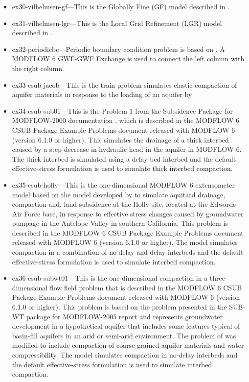 \begin{itemize}
\item ex30-vilhelmsen-gf---This is the Globally Fine (GF) model described in \cite{vilhelmsen2012evaluation}.

\item ex31-vilhelmsen-lgr---This is the Local Grid Refinement (LGR) model described in \cite{vilhelmsen2012evaluation}.

\item ex32-periodicbc---Periodic boundary condition problem is based on \cite{laattoe2014spatial}. A MODFLOW 6 GWF-GWF Exchange is used to connect the left column with the right column. 

\item ex33-csub-jacob---This is the \cite{jacob1939fluctuations} train problem simulates elastic compaction of aquifer materials in response to the loading of an aquifer by

\item ex34-csub-sub01---This is the Problem 1 from the Subsidence Package for MODFLOW-2000 documentation \citep{hoffmann2003modflow}, which is described in the MODFLOW 6 CSUB Package Example Problems document released with MODFLOW 6 (version 6.1.0 or higher).  This simulates the drainage of a thick interbed caused by a step decrease in hydraulic head in the aquifer in MODFLOW 6. The thick interbed is simulated using a delay-bed interbed and the default effective-stress formulation is used to simulate thick interbed compaction.

\item ex35-csub-holly---This is the one-dimensional MODFLOW 6 extensometer model based on the model developed by \cite{sneed2008} to simulate aquitard drainage, compaction and, land subsidence at the Holly site, located at the Edwards Air Force base, in response to effective stress changes caused by groundwater pumpage in the Antelope Valley in southern California. This problem is described in the MODFLOW 6 CSUB Package Example Problems document released with MODFLOW 6 (version 6.1.0 or higher). The model simulates compaction in a combination of no-delay and delay interbeds and the default effective-stress formulation is used to simulate interbed compaction.

\item ex36-csub-subwt01---This is the one-dimensional compaction in a three-dimensional flow field problem that is described in the MODFLOW 6 CSUB Package Example Problems document released with MODFLOW 6 (version 6.1.0 or higher). This problem is based on the problem presented in the SUB-WT package for MODFLOW-2005 report \citep{leake2007modflow} and represents groundwater development in a hypothetical aquifer that includes some features typical of basin-fill aquifers in an arid or semi-arid environment. The problem of \cite{leake2007modflow} was modified to include compaction of coarse-grained aquifer materials and water compressibility. The model simulates compaction in no-delay interbeds and the default effective-stress formulation is used to simulate interbed compaction.
\end{itemize}
